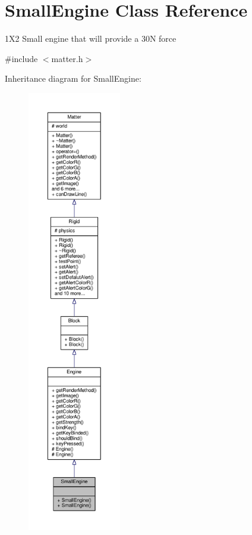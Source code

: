 \hypertarget{classSmallEngine}{}\section{Small\+Engine Class Reference}
\label{classSmallEngine}


1\+X2 Small engine that will provide a 30\+N force  




{\ttfamily \#include $<$matter.\+h$>$}



Inheritance diagram for Small\+Engine\+:\nopagebreak
\begin{figure}[H]
\begin{center}
\leavevmode
\includegraphics[height=550pt]{classSmallEngine__inherit__graph}
\end{center}
\end{figure}


